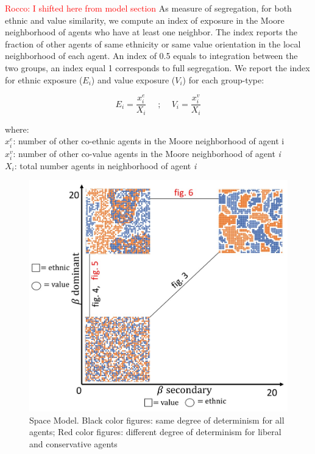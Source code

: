 \documentclass{article}
\newcommand{\rocco}[1]{{\textcolor{red}{Rocco: #1}}} %
\begin{document}
\rocco{I shifted here from model section} As measure of segregation, for both ethnic and value similarity, we compute an index of exposure in the Moore neighborhood of agents who have at least one neighbor. The index reports %
the fraction of other agents of same ethnicity or same value orientation in the local neighborhood of each agent. An index of 0.5 equals to integration between the two groups, an index equal 1 corresponds to full segregation. We report the index for ethnic exposure ($E_i$) and value exposure ($V_i$) for each group-type:

\begin{equation}
   E_i = \frac{x^e_i}{X_i}\quad\text{   ;    }\quad  V_i = \frac{x^v_i}{X_i}
\end{equation}

where:\\
$x^e_i$: number of other co-ethnic agents in the Moore neighborhood of agent i\\
$x^v_i$: number of other co-value  agents in the Moore neighborhood of agent \textit{i}\\
$X_i$: total number agents in neighborhood of agent \textit{i}\\


\begin{figure}[h]
    \centering
    \includegraphics[width=1\textwidth]{material/figures/model_space.jpg}
    \caption{Space Model. Black color figures: same degree of determinism for all agents; Red color figures: different degree of determinism for liberal and conservative agents}
    \label{fig:space}
\end{figure}
\end{document}
